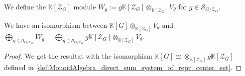 \begin{definition}
    \label{def:induced_rep_tensor_direct_sum_component}
    \leanok
    We define the $\mathbb{K}[\mathcal{Z}_G]$ module $W_g:= g\mathbb{K}[\mathcal{Z}_G]\otimes_{\mathbb{K}[\mathcal{Z}_G]}V_\theta$
    for $g\in \mathcal{S}_{G/\mathcal{Z}_G}$.
\end{definition}

\begin{definition}
    \label{def:induced_rep_tensor_iso_direct_sum}
    \leanok
    We have an isomorphism between $\mathbb{K}[G]\otimes_{\mathbb{K}[\mathcal{Z}_G]}V_\theta$
    and $\bigoplus\limits_{g\in \mathcal{S}_{G/\mathcal{Z}_G}}W_g=\bigoplus\limits_{g\in \mathcal{S}_{G/\mathcal{Z}_G}} g \mathbb{K}[\mathcal{Z}_G]
    \otimes_{\mathbb{K}[\mathcal{Z}_G]} V_\theta$.
    \begin{proof}
        We get the resultat with the isomorphism $\mathbb{K}[G] \cong \otimes_{\mathbb{K}[\mathcal{Z}_G]} g\mathbb{K}[\mathcal{Z}_G]$ 
        defined in \ref{def:MonoidAlgebra_direct_sum_system_of_repr_center_set}.
    \end{proof}
\end{definition}